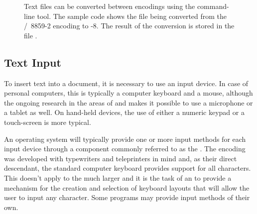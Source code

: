 \documentclass[
  a5paper,10pt,           %
  dvipsnames              %
]{book}
\begin{document}
\begin{figure}
  \centerline{}%
  \caption{Text files can be converted between encodings using the
     command-line tool. The sample code shows the file
     being converted from the
    /~8859-2 encoding to \mbox{-8}.
    The result of the conversion is stored in the file .}
\end{figure}


\subsection{Text Input}
To insert text into a document, it is necessary to use an input device. In case
of personal computers, this is typically a computer keyboard and a mouse,
although the ongoing research in the areas of  and 
makes it possible to use a microphone or a tablet as well. On hand-held devices,
the use of either a numeric keypad or a touch-screen is more typical.

An operating system will typically provide one or more input methods for each
input device through a component commonly referred to as the . The
 encoding was developed with typewriters and teleprinters in
mind and, as their direct descendant, the standard computer keyboard provides
support for all  characters. This doesn't apply to the much
larger  and it is the task of an  to provide a
mechanism for the creation and selection of keyboard layouts that will allow the
user to input any  character. Some programs may provide input
methods of their own.
\end{document}
